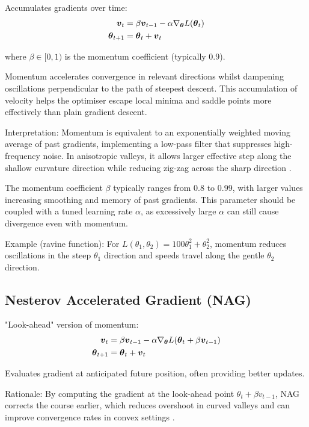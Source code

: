 Accumulates gradients over time:
\begin{align}
\boldsymbol{v}_t &= \beta \boldsymbol{v}_{t-1} - \alpha \nabla_{\boldsymbol{\theta}} L(\boldsymbol{\theta}_t) \\
\boldsymbol{\theta}_{t+1} &= \boldsymbol{\theta}_t + \boldsymbol{v}_t
\end{align}

where $\beta \in [0, 1)$ is the momentum coefficient (typically 0.9).

Momentum accelerates convergence in relevant directions whilst dampening oscillations perpendicular to the path of steepest descent. This accumulation of velocity helps the optimiser escape local minima and saddle points more effectively than plain gradient descent.

Interpretation: Momentum is equivalent to an exponentially weighted moving average of past gradients, implementing a low-pass filter that suppresses high-frequency noise. In anisotropic valleys, it allows larger effective step along the shallow curvature direction while reducing zig-zag across the sharp direction \cite{Polyak1964,WebOptimizationDLBook,D2LChapterOptimization}.

The momentum coefficient \(\beta\) typically ranges from 0.8 to 0.99, with larger values increasing smoothing and memory of past gradients. This parameter should be coupled with a tuned learning rate \(\alpha\), as excessively large \(\alpha\) can still cause divergence even with momentum.

Example (ravine function): For \(L(\theta_1,\theta_2)=100\theta_1^2+\theta_2^2\), momentum reduces oscillations in the steep \(\theta_1\) direction and speeds travel along the gentle \(\theta_2\) direction.

\subsection{Nesterov Accelerated Gradient (NAG)}

"Look-ahead" version of momentum:
\begin{align}
\boldsymbol{v}_t &= \beta \boldsymbol{v}_{t-1} - \alpha \nabla_{\boldsymbol{\theta}} L(\boldsymbol{\theta}_t + \beta \boldsymbol{v}_{t-1}) \\
\boldsymbol{\theta}_{t+1} &= \boldsymbol{\theta}_t + \boldsymbol{v}_t
\end{align}

Evaluates gradient at anticipated future position, often providing better updates.

Rationale: By computing the gradient at the look-ahead point \(\theta_t+\beta v_{t-1}\), NAG corrects the course earlier, which reduces overshoot in curved valleys and can improve convergence rates in convex settings \cite{Nesterov1983,WebOptimizationDLBook,GoodfellowEtAl2016}.

